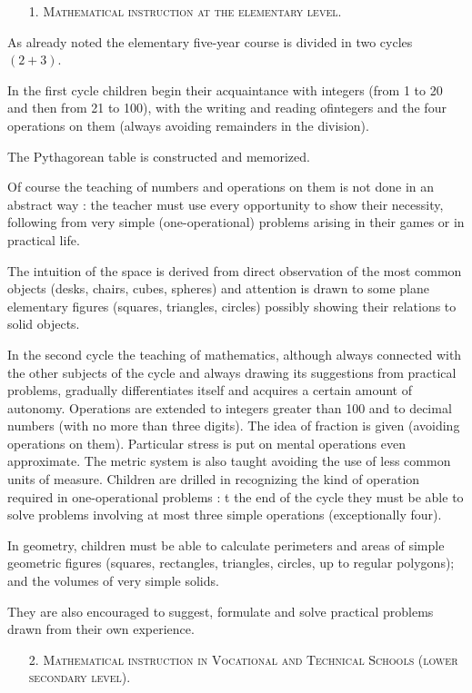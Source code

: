 \begin{itemize}
\item[1.] \textsc{Mathematical instruction at the elementary level}.
\end{itemize}

As already noted the elementary five-year course is divided in two cycles $(2+3)$.

In the first cycle children begin their acquaintance with integers (from 1 to 20 and then from 21 to 100), with the writing and reading of\pageoriginale integers and the four operations on them (always avoiding remainders in the division).

The Pythagorean table is constructed and memorized.

Of course the teaching of numbers and operations on them is not done in an abstract way : the teacher must use every opportunity to show their necessity, following from very simple (one-operational) problems arising in their games or in practical life.

The intuition of the space is derived from direct observation of the most common objects (desks, chairs, cubes, spheres) and attention is drawn to some plane elementary figures (squares, triangles, circles) possibly showing their relations to solid objects.

In the second cycle the teaching of mathematics, although always connected with the other subjects of the cycle and always drawing its suggestions from practical problems, gradually differentiates itself and acquires a certain amount of autonomy. Operations are extended to integers greater than 100 and to decimal numbers (with no more than three digits). The idea of fraction is given (avoiding operations on them). Particular stress is put on mental operations even approximate. The metric system is also taught avoiding the use of less common units of measure. Children are drilled in recognizing the kind of operation required in one-operational problems : t the end of the cycle they must be able to solve problems involving at most three simple operations (exceptionally four).

In geometry, children must be able to calculate perimeters and areas of simple geometric figures (squares, rectangles, triangles, circles, up to regular polygons); and the volumes of very simple solids.

They are also encouraged to suggest, formulate and solve practical problems drawn from their own experience.

\begin{itemize}
\item[2.] \textsc{Mathematical instruction in Vocational and Technical Schools (lower secondary level).}
\end{itemize}

